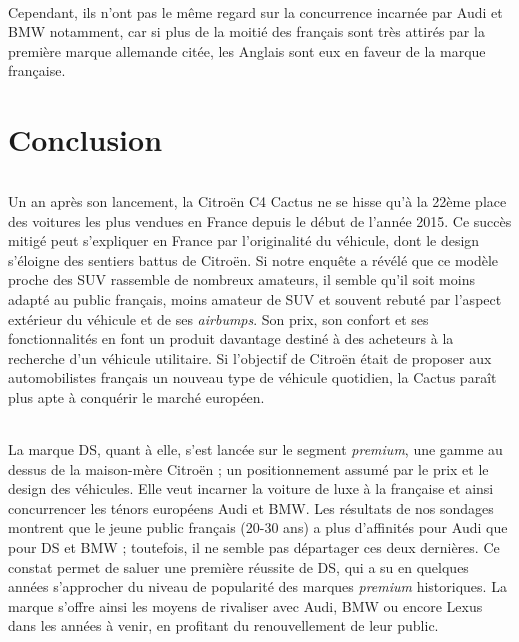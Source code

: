 \documentclass[12pt]{article}\usepackage[]{graphicx}\usepackage[]{color}
\begin{document}
\paragraph{} Cependant, ils n'ont pas le même regard sur la concurrence
incarnée par Audi et BMW notamment, car si plus de la moitié des français sont
très attirés par la première marque allemande citée, les Anglais sont eux en
faveur de la marque française.

\break

\part{Conclusion}

\paragraph{} Un an après son lancement, la Citroën C4 Cactus ne se hisse qu'à la 22ème place des voitures les plus vendues en France depuis le début de l’année 2015. Ce succès mitigé peut s'expliquer en France par l'originalité du véhicule, dont le design s'éloigne des sentiers battus de Citroën. Si notre enquête a révélé que ce modèle proche des SUV rassemble de nombreux amateurs, il semble qu'il soit moins adapté au public français, moins amateur de SUV et souvent rebuté par l'aspect extérieur du véhicule et de ses \textit{airbumps}. Son prix, son confort et ses fonctionnalités en font un produit davantage destiné à des acheteurs à la recherche d'un véhicule utilitaire. Si l'objectif de Citroën était de proposer aux automobilistes français un nouveau type de véhicule quotidien, la Cactus paraît plus apte à conquérir le marché européen.


\paragraph{} La marque DS, quant à elle, s’est lancée sur le segment \textit{premium}, une gamme au dessus de la maison-mère Citroën ; un positionnement assumé par le prix et le design des véhicules. Elle veut incarner la voiture de luxe à la française et ainsi concurrencer les ténors européens Audi et BMW. Les résultats de nos sondages montrent que le jeune public français (20-30 ans) a plus d'affinités pour Audi que pour DS et BMW ; toutefois, il ne semble pas départager ces deux dernières. Ce constat permet de saluer une première réussite de DS, qui a su en quelques années s'approcher du niveau de popularité des marques \textit{premium} historiques. La marque s'offre ainsi les moyens de rivaliser avec Audi, BMW ou encore Lexus dans les années à venir, en profitant du renouvellement de leur public.
\end{document}
